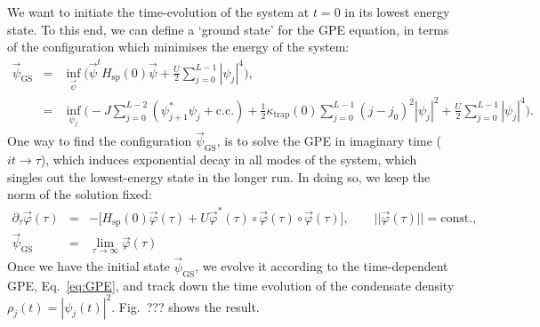 \documentclass{SciPost}
\newcommand\0{\scalebox{-1}[1]{0}}
\begin{document}
We want to initiate the time-evolution of the system at $t=0$ in its lowest energy state. To this end, we can define a `ground state' for the GPE equation, in terms of the configuration which minimises the energy of the system:
\begin{eqnarray}
\vec\psi_\mathrm{GS} &=& \inf_{\vec{\psi}} \bigg( {\vec{\psi}}^t H_\mathrm{sp}(0)\vec{\psi} + \frac{U}{2}\sum_{j=0}^{L-1}|\psi_j|^4\bigg),\nonumber\\
&=&\inf_{\psi_j} \bigg(-J\sum_{j=0}^{L-2} (\psi_{j+1}^*\psi_j + \mathrm{c.c.}) + \frac{1}{2}\kappa_\mathrm{trap}(0)\sum_{j=0}^{L-1}(j-j_0)^2|\psi_j|^2 + \frac{U}{2}\sum_{j=0}^{L-1}|\psi_j|^4\bigg).
\end{eqnarray} 
One way to find the configuration $\vec\psi_\mathrm{GS}$, is to solve the GPE in imaginary time ($it\to \tau$), which induces exponential decay in all modes of the system, which singles out the lowest-energy state in the longer run. In doing so, we keep the norm of the solution fixed:
\begin{eqnarray}
\label{eq:GPE_imag}
\partial_{\tau}\vec\varphi(\tau) &=& -\bigg[H_\mathrm{sp}(0)\vec\varphi(\tau) + U {\vec\varphi}^*(\tau)\circ \vec\varphi(\tau)\circ \vec\varphi(\tau)\bigg],\qquad ||\vec\varphi(\tau)||=\mathrm{const.},\nonumber\\
\vec{\psi}_\mathrm{GS} &=& \lim_{\tau\to\infty}\vec\varphi(\tau)
\end{eqnarray}
Once we have the initial state $\vec\psi_\mathrm{GS}$, we evolve it according to the time-dependent GPE, Eq.~\eqref{eq:GPE}, and track down the time evolution of the condensate density $\rho_j(t)=|\psi_j(t)|^2$. Fig.~??? shows the result.
\end{document}

